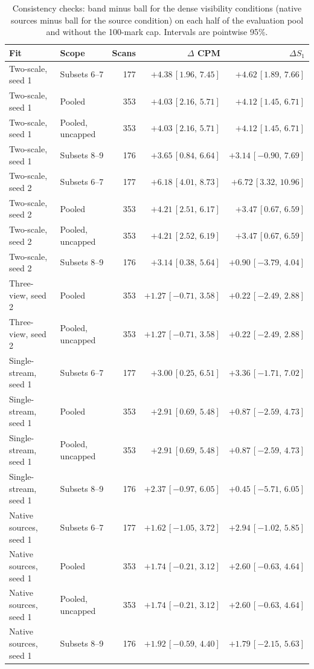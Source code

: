 \begin{table}[!t]
\centering
\small
\caption{Consistency checks: band minus ball for the dense visibility conditions (native sources minus ball for the source condition) on each half of the evaluation pool and without the 100-mark cap. Intervals are pointwise 95\%.}
\label{tab:consistency}
\begin{tabular}{@{}llrrr@{}}
\toprule
Fit & Scope & Scans & $\Delta$ CPM & $\Delta S_1$ \\
\midrule
Two-scale, seed 1 & Subsets 6--7 & 177 & $+4.38\,[1.96,\,7.45]$ & $+4.62\,[1.89,\,7.66]$ \\
Two-scale, seed 1 & Pooled & 353 & $+4.03\,[2.16,\,5.71]$ & $+4.12\,[1.45,\,6.71]$ \\
Two-scale, seed 1 & Pooled, uncapped & 353 & $+4.03\,[2.16,\,5.71]$ & $+4.12\,[1.45,\,6.71]$ \\
Two-scale, seed 1 & Subsets 8--9 & 176 & $+3.65\,[0.84,\,6.64]$ & $+3.14\,[-0.90,\,7.69]$ \\
\midrule
Two-scale, seed 2 & Subsets 6--7 & 177 & $+6.18\,[4.01,\,8.73]$ & $+6.72\,[3.32,\,10.96]$ \\
Two-scale, seed 2 & Pooled & 353 & $+4.21\,[2.51,\,6.17]$ & $+3.47\,[0.67,\,6.59]$ \\
Two-scale, seed 2 & Pooled, uncapped & 353 & $+4.21\,[2.52,\,6.19]$ & $+3.47\,[0.67,\,6.59]$ \\
Two-scale, seed 2 & Subsets 8--9 & 176 & $+3.14\,[0.38,\,5.64]$ & $+0.90\,[-3.79,\,4.04]$ \\
\midrule
Three-view, seed 2 & Pooled & 353 & $+1.27\,[-0.71,\,3.58]$ & $+0.22\,[-2.49,\,2.88]$ \\
Three-view, seed 2 & Pooled, uncapped & 353 & $+1.27\,[-0.71,\,3.58]$ & $+0.22\,[-2.49,\,2.88]$ \\
\midrule
Single-stream, seed 1 & Subsets 6--7 & 177 & $+3.00\,[0.25,\,6.51]$ & $+3.36\,[-1.71,\,7.02]$ \\
Single-stream, seed 1 & Pooled & 353 & $+2.91\,[0.69,\,5.48]$ & $+0.87\,[-2.59,\,4.73]$ \\
Single-stream, seed 1 & Pooled, uncapped & 353 & $+2.91\,[0.69,\,5.48]$ & $+0.87\,[-2.59,\,4.73]$ \\
Single-stream, seed 1 & Subsets 8--9 & 176 & $+2.37\,[-0.97,\,6.05]$ & $+0.45\,[-5.71,\,6.05]$ \\
\midrule
Native sources, seed 1 & Subsets 6--7 & 177 & $+1.62\,[-1.05,\,3.72]$ & $+2.94\,[-1.02,\,5.85]$ \\
Native sources, seed 1 & Pooled & 353 & $+1.74\,[-0.21,\,3.12]$ & $+2.60\,[-0.63,\,4.64]$ \\
Native sources, seed 1 & Pooled, uncapped & 353 & $+1.74\,[-0.21,\,3.12]$ & $+2.60\,[-0.63,\,4.64]$ \\
Native sources, seed 1 & Subsets 8--9 & 176 & $+1.92\,[-0.59,\,4.40]$ & $+1.79\,[-2.15,\,5.63]$ \\
\bottomrule
\end{tabular}
\end{table}
